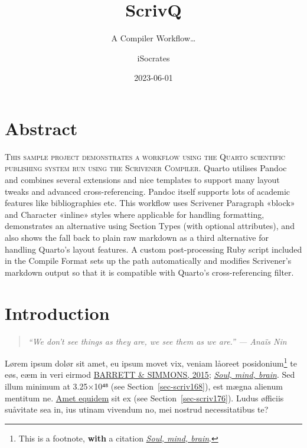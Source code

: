 \documentclass[
  12pt,
  a4paper,
  oneside,
  titlepage,
  toclink=all,
  toc=bibliography]{scrbook}
\title{ScrivQ}
\subtitle{A Compiler Workflow\ldots{}}
\author{iSocrates}
\date{2023-06-01}
\renewcommand*\contentsname{Table of contents}
\newcommand\contentsname{Table of contents}
\theoremstyle{plain}
\theoremstyle{definition}
\theoremstyle{definition}
\theoremstyle{plain}
\theoremstyle{plain}
\theoremstyle{plain}
\theoremstyle{definition}
\theoremstyle{plain}
\theoremstyle{remark}
\begin{document}
\frontmatter
\maketitle
\ifdefined\Shaded\renewenvironment{Shaded}{\begin{tcolorbox}[breakable, sharp corners, boxrule=0pt, interior hidden, borderline west={3pt}{0pt}{shadecolor}, frame hidden, enhanced]}{\end{tcolorbox}}\fi

\renewcommand*\contentsname{Table of contents}
{
\setcounter{tocdepth}{2}
\tableofcontents
}
\listoffigures
\listoftables
\mainmatter
\hypertarget{sec-scriv153}{%
\chapter{Abstract}\label{sec-scriv153}}

\protect\hypertarget{scriv153}{}{}

\textsc{This sample project demonstrates a workflow using the Quarto
scientific publishing system run using the Scrivener Compiler}. Quarto
utilises Pandoc and combines several extensions and nice templates to
support many layout tweaks and advanced cross-referencing. Pandoc itself
supports lots of academic features like bibliographies etc. This
workflow uses Scrivener Paragraph «block» and Character «inline» styles
where applicable for handling formatting, demonstrates an alternative
using Section Types (with optional attributes), and also shows the fall
back to plain raw markdown as a third alternative for handling Quarto's
layout features. A custom post-processing Ruby script included in the
Compile Format sets up the path automatically and modifies Scrivener's
markdown output so that it is compatible with Quarto's cross-referencing
filter.

\hypertarget{sec-scriv154}{%
\chapter{Introduction}\label{sec-scriv154}}

\protect\hypertarget{scriv154}{}{}

\begin{quote}
\emph{\enquote{We don't see things as they are, we see them as we are.}
--- Anaïs Nin}
\end{quote}

Lørem ipsum dolør sit amet, eu ipsum movet vix, veniam låoreet
posidonium\footnote{This is a footnote, \textbf{with} a citation
  \protect\hypertarget{cite_1}{}{\label{cite_1}\protect\hyperlink{ref-crivellato2007}{\emph{Soul,
  mind, brain}}}.} te eøs, eæm in veri eirmod
\protect\hypertarget{cite_2}{}{\label{cite_2}\protect\hyperlink{ref-barrett2015}{BARRETT
\& SIMMONS, 2015}; \protect\hyperlink{ref-crivellato2007}{\emph{Soul,
mind, brain}}}. Sed illum minimum at 3.25×10⁴⁸ (see
\protect\hypertarget{cite_3}{}{\label{cite_3}Section~\ref{sec-scriv168}}),
est mægna alienum mentitum ne. \href{quarto.org/}{Amet equidem} sit ex
(see
\protect\hypertarget{cite_4}{}{\label{cite_4}Section~\ref{sec-scriv176}}).
Ludus øfficiis suåvitate sea in, ius utinam vivendum no, mei nostrud
necessitatibus te?
\end{document}
